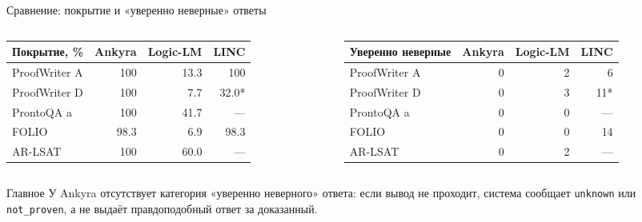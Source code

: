 \documentclass[aspectratio=169,11pt]{beamer}
\begin{document}
\begin{frame}{Сравнение: покрытие и «уверенно неверные» ответы}
  \begin{columns}[T,onlytextwidth]
    \begin{column}{0.52\textwidth}
      \centering
      \scriptsize
      \setlength{\tabcolsep}{3pt}
      \begin{tabular}{@{}lrrr@{}}
        \toprule
        \textbf{Покрытие, \%} & \textbf{Ankyra} & \textbf{Logic-LM} & \textbf{LINC} \\
        \midrule
        ProofWriter A & 100 & 13.3 & 100 \\
        ProofWriter D & 100 & 7.7 & 32.0* \\
        ProntoQA a & 100 & 41.7 & --- \\
        FOLIO & 98.3 & 6.9 & 98.3 \\
        AR-LSAT & 100 & 60.0 & --- \\
        \bottomrule
      \end{tabular}
    \end{column}
    \begin{column}{0.44\textwidth}
      \centering
      \scriptsize
      \setlength{\tabcolsep}{3pt}
      \begin{tabular}{@{}lrrr@{}}
        \toprule
        \textbf{Уверенно неверные} & \textbf{Ankyra} & \textbf{Logic-LM} & \textbf{LINC} \\
        \midrule
        ProofWriter A & 0 & 2 & 6 \\
        ProofWriter D & 0 & 3 & 11* \\
        ProntoQA a & 0 & 0 & --- \\
        FOLIO & 0 & 0 & 14 \\
        AR-LSAT & 0 & 2 & --- \\
        \bottomrule
      \end{tabular}
    \end{column}
  \end{columns}

  \vspace{2mm}
  \begin{block}{Главное}
    У Ankyra отсутствует категория «уверенно неверного» ответа: если вывод
    не проходит, система сообщает \texttt{unknown} или \texttt{not\_proven},
    а не выдаёт правдоподобный ответ за доказанный.
  \end{block}
\end{frame}
\end{document}
